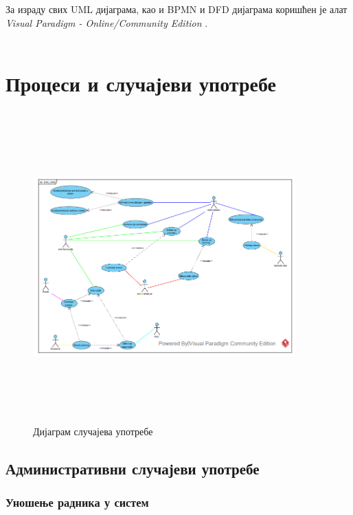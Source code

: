 \documentclass{article}
\begin{document}
За израду свих UML дијаграма, као 
и BPMN и DFD дијаграма коришћен је алат \textit{Visual Paradigm - Online/Community Edition} \cite{vs}.\\\\

\section{Процеси и случајеви употребе}

\begin{figure}[H]
\centering
\includegraphics[width=0.9\textwidth, height=12cm]{Dijagrami_slike/uc_diagram.png}
\caption{\label{fig:uc_diagram}Дијаграм случајева употребе}
\end{figure}

\subsection{Административни случајеви употребе}

\subsubsection{Уношење радника у систем}
\end{document}

